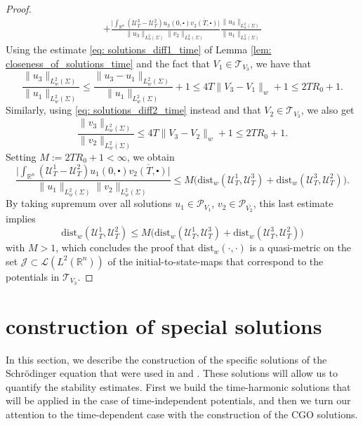 \documentclass[10pt,a4paper]{amsart}
\theoremstyle{remark}
\theoremstyle{definition}
\newcommand{\R}{\mathbb{R}}
\newcommand{\dist}{\mathrm{dist}}
\def\cal{\mathcal}
\def\ovl{\overline}
\def\cd{\centerdot}
\begin{document}
\begin{proof}
\begin{align*}
%
+ \frac{\Big| \displaystyle \int_{\R^n} (\cal{U}^3_T -\cal{U}^2_T) u_3(0, \cd) \ovl{v_2(T, \cd)}\Big|}{\|u_3\|_{L^2_w(\Sigma)} \|v_2\|_{L^2_w(\Sigma)}} \frac{\|u_3\|_{L^2_w(\Sigma)}}{\|u_1\|_{L^2_w(\Sigma)}}
\end{align*}
%
Using the estimate \eqref{eq: solutions_diff1_time} of Lemma \ref{lem: closeness_of_solutions_time} and the fact that $V_1\in\cal{T}_{V_3}$, we have that 
%
\[
\frac{\|u_3\|_{L^2_w(\Sigma)}}{\|u_1\|_{L^2_w(\Sigma)}} \leq \frac{\|u_3 - u_1\|_{L^2_w(\Sigma)}}{\|u_1\|_{L^2_w(\Sigma)}} + 1 
\leq 4T \| V_3 - V_1\|_w +1 
\leq  2T R_0 +1 .
\]
%
Similarly, using \eqref{eq: solutions_diff2_time} instead and that $V_2\in \cal{T}_{V_3}$, we also get 
%
\[
\frac{\|v_3\|_{L^2_w(\Sigma)}}{\|v_2\|_{L^2_w(\Sigma)}} \leq 4T \| V_3 - V_2 \|_w +1
\leq 2T R_0 +1.
\]
%
Setting $ M:=  2T R_0 +1 < \infty$, we obtain 
%
\[
\frac{\Big| \displaystyle \int_{\R^n} (\cal{U}^1_T -\cal{U}^2_T) u_1(0, \cd) \ovl{v_2(T, \cd)}\Big|}{\|u_1\|_{L^2_w(\Sigma)} \|v_2\|_{L^2_w(\Sigma)}} 
\leq M \Big( \dist_w(\cal{U}_T^1, \cal{U}_T^3) + \dist_w(\cal{U}_T^3, \cal{U}_T^2) \Big).
\]
%
By taking supremum over all solutions $u_1\in \cal{P}_{V_1}$, $v_2 \in \cal{P}_{\ovl{V_2}}$, this last estimate implies 
%
\[
\dist_w(\cal{U}_T^1, \cal{U}_T^2) \leq M \Big( \dist_w(\cal{U}_T^1, \cal{U}_T^3) + \dist_w(\cal{U}_T^3, \cal{U}_T^2) \Big)
\]
%
with $M > 1$, which concludes the proof that $\dist_w(\cdot, \cdot)$ is a quasi-metric on the set $\cal{J} \subset \cal{L}(L^2(\R^n))$ of the initial-to-state-maps that correspond to the potentials in $\cal{T}_{V_3}$. 
%
\end{proof}







%
\section{construction of special solutions}\label{sec: solutions_construction}
%
In this section, we describe the construction of the specific solutions of the Schr\"odinger equation that were used in \cite{zbMATH08122191} and \cite{zbMATH07801151}. These solutions will allow us to quantify the stability estimates. First we build the time-harmonic solutions that will be applied in the case of time-independent potentials, and then we turn our attention to the time-dependent case with the construction of the CGO solutions. 
\end{document}
